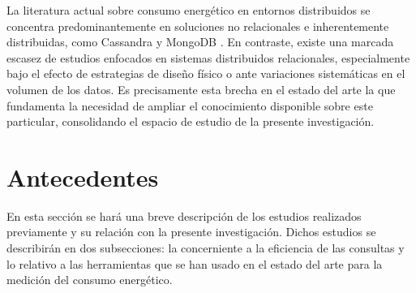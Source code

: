 \documentclass[12pt, letter paper]{report}
\begin{document}
      La literatura actual sobre consumo energético en entornos distribuidos se
      concentra predominantemente en soluciones no relacionales e inherentemente
      distribuidas, como Cassandra y MongoDB \cite{foschinisql2023,
      gomesenergy2016, subramaniamenergy2015}. En contraste, existe una marcada
      escasez de estudios enfocados en sistemas distribuidos relacionales,
      especialmente bajo el efecto de estrategias de diseño físico o ante
      variaciones sistemáticas en el volumen de los datos. Es precisamente esta
      brecha en el estado del arte la que fundamenta la necesidad de ampliar el
      conocimiento disponible sobre este particular, consolidando el espacio de
      estudio de la presente investigación.

    \section{Antecedentes} %
    \label{sec:antecedentes}
      En esta sección se hará una breve descripción de los estudios realizados
      previamente y su relación con la presente investigación. Dichos estudios
      se describirán en dos subsecciones: la concerniente a la eficiencia de las
      consultas y lo relativo a las herramientas que se han usado en el estado
      del arte para la medición del consumo energético.
\end{document}
